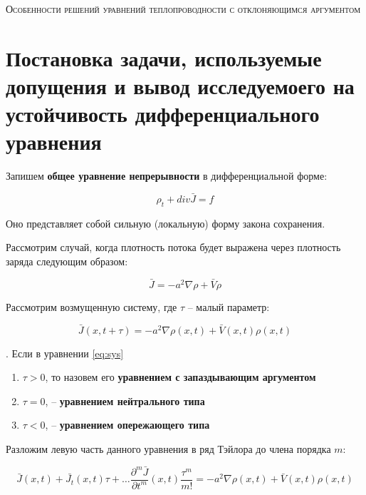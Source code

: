 \begin{center}
\textsc{\Huge{Особенности решений уравнений теплопроводности с отклоняющимся аргументом\\}}
\end{center}

\section{Постановка задачи, используемые допущения и вывод исследуемоего на устойчивость дифференциального \\уравнения}

Запишем \textbf{общее уравнение непрерывности} в дифференциальной форме:

\begin{equation}\label{eq:main}
\rho_t + div \bar{J} = f
\end{equation}

Оно представляет собой сильную (локальную) форму закона сохранения.

Рассмотрим случай, когда плотность потока будет выражена через плотность заряда следующим образом:

\begin{equation}
\bar{J} = -a^2 \nabla \rho + \bar{V} \rho
\end{equation}

Рассмотрим возмущенную систему, где $\tau$ \--- малый параметр:

\begin{equation}\label{eq:sys}
\bar{J}(x,t+\tau) = -a^2 \nabla \rho(x,t) + \bar{V}(x,t) \rho(x,t)
\end{equation}

. Если в уравнении \ref{eq:sys}
\begin{enumerate}
\item $\tau>0$, то назовем его \textbf{уравнением с запаздывающим аргументом}
\item $\tau=0$, \--- \textbf{уравнением нейтрального типа}
\item $\tau<0$, \--- \textbf{уравнением опережающего типа}
\end{enumerate}

Разложим левую часть данного уравнения в ряд Тэйлора до члена порядка $m$:

\begin{equation*}
\bar{J}(x,t) + \bar{J_t}(x,t) \tau + \dots \dfrac{\partial^m \bar{J}}{\partial t^m}(x,t) \dfrac{\tau^m}{m!} = -a^2 \nabla \rho(x,t) + \bar{V}(x,t) \rho(x,t)
\end{equation*}

